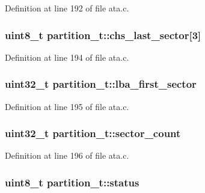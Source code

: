 Definition at line 192 of file ata.\+c.

\subsubsection[{\texorpdfstring{chs\+\_\+last\+\_\+sector}{chs_last_sector}}]{\setlength{\rightskip}{0pt plus 5cm}uint8\+\_\+t partition\+\_\+t\+::chs\+\_\+last\+\_\+sector\mbox{[}3\mbox{]}}\hypertarget{structpartition__t_a6d59b11236b1152a4c5c6bd95e0da572}{}\label{structpartition__t_a6d59b11236b1152a4c5c6bd95e0da572}


Definition at line 194 of file ata.\+c.

\subsubsection[{\texorpdfstring{lba\+\_\+first\+\_\+sector}{lba_first_sector}}]{\setlength{\rightskip}{0pt plus 5cm}uint32\+\_\+t partition\+\_\+t\+::lba\+\_\+first\+\_\+sector}\hypertarget{structpartition__t_a8e9cf3ec4df990b9d7be97d8fb3f784d}{}\label{structpartition__t_a8e9cf3ec4df990b9d7be97d8fb3f784d}


Definition at line 195 of file ata.\+c.

\subsubsection[{\texorpdfstring{sector\+\_\+count}{sector_count}}]{\setlength{\rightskip}{0pt plus 5cm}uint32\+\_\+t partition\+\_\+t\+::sector\+\_\+count}\hypertarget{structpartition__t_a0a7b2794fde517b15f4d26742073e3c4}{}\label{structpartition__t_a0a7b2794fde517b15f4d26742073e3c4}


Definition at line 196 of file ata.\+c.

\subsubsection[{\texorpdfstring{status}{status}}]{\setlength{\rightskip}{0pt plus 5cm}uint8\+\_\+t partition\+\_\+t\+::status}\hypertarget{structpartition__t_a567c26aadcffa836d35e6998a5b0725a}{}\label{structpartition__t_a567c26aadcffa836d35e6998a5b0725a}


